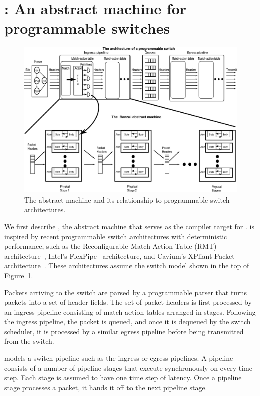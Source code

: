 \section{\absmachine: An abstract machine for programmable switches}
\label{s:absmachine}

\begin{figure}[!t]
  \includegraphics[width=\textwidth]{banzai.pdf}
  \caption{The \absmachine abstract machine and its relationship to programmable switch architectures.}
  \label{fig:switch}
\end{figure}

We first describe \absmachine, the abstract machine that serves as the compiler
target for \pktlanguage. \absmachine is inspired by recent programmable switch
architectures with deterministic performance, such as the Reconfigurable
Match-Action Table (RMT) architecture~\cite{rmt}, Intel's
FlexPipe~\cite{flexpipe} architecture, and Cavium's XPliant Packet
architecture~\cite{xpliant}. These architectures assume the switch model shown
in the top of Figure~\ref{fig:switch}.

Packets arriving to the switch are parsed by a programmable parser that turns
packets into a set of header fields. The set of packet headers is first
processed by an ingress pipeline consisting of match-action tables arranged in
stages. Following the ingress pipeline, the packet is queued, and once it is
dequeued by the switch scheduler, it is processed by a similar egress pipeline
before being transmitted from the switch.

\absmachine models a switch pipeline such as the ingress or egress
pipelines. A pipeline consists of a number of pipeline stages that
execute synchronously on every time step. Each stage is assumed to
have one time step of latency. Once a pipeline stage processes a
packet, it hands it off to the next pipeline stage.

